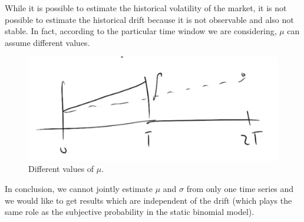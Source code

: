 \newline While it is possible to estimate the historical volatility of the market, it is not possible to estimate the historical drift because it is not observable and also not stable. In fact, according to the particular time window we are considering, $\mu$ can assume different values.
\begin{figure}[htp]
    \centering
    \includegraphics[scale=0.3]{fig/tmp/fig11.png}
    \caption{Different values of $\mu$.}
    \label{fig:mu}
\end{figure}
\newline In conclusion, we cannot jointly estimate $\mu$ and $\sigma$ from only one time series and we would like to get results which are independent of the drift (which plays the same role as the subjective probability in the static binomial model).

